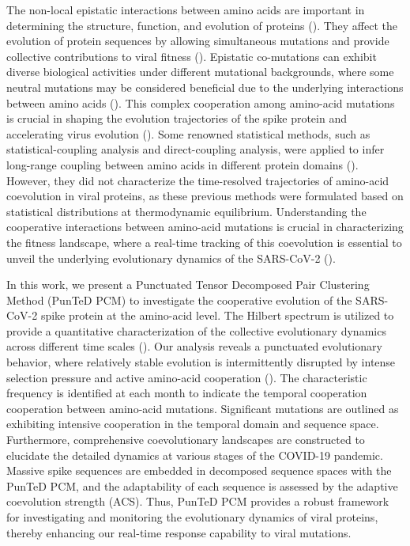\documentclass{sysbio}%
\begin{document}
The non-local epistatic interactions between amino acids are important in determining the structure, function, and evolution of proteins (\cite{eptasis_overall,sca}). They affect the evolution of protein sequences by allowing simultaneous mutations and provide collective contributions to viral fitness (\cite{DMS_binding_affinity,pingzhi,epistasis_lower_b}). Epistatic co-mutations can exhibit diverse biological activities under different mutational backgrounds, where some neutral mutations may be considered beneficial due to the underlying interactions between amino acids (\cite{epistasis_compensatory,epistasis_g}). This complex cooperation among amino-acid mutations is crucial in shaping the evolution trajectories of the spike protein and accelerating virus evolution (\cite{constrain,viral_evo_constrain,bak1993punctuated,bak1989self}). 
Some renowned statistical methods, such as statistical-coupling analysis and direct-coupling analysis, were applied to infer long-range coupling between amino acids in different protein domains (\cite{sca,dca}). However, they did not characterize the time-resolved trajectories of amino-acid coevolution in viral proteins, as these previous methods were formulated based on statistical distributions at thermodynamic equilibrium. Understanding the cooperative interactions between amino-acid mutations is crucial in characterizing the fitness landscape, where a real-time tracking of this coevolution is essential to unveil the underlying evolutionary dynamics of the SARS-CoV-2 (\cite{pingzhi}). 

In this work, we present a Punctuated Tensor Decomposed Pair Clustering Method (PunTeD PCM) to investigate the cooperative evolution of the SARS-CoV-2 spike protein at the amino-acid level. The Hilbert spectrum is utilized to provide a quantitative characterization of the collective evolutionary dynamics across different time scales (\cite{huang2014hilbert}). Our analysis reveals a punctuated evolutionary behavior, where relatively stable evolution is intermittently disrupted by intense selection pressure and active amino-acid cooperation (\cite{bak1993punctuated,JianLu2023MBE}). The characteristic frequency is identified at each month to indicate the temporal cooperation cooperation between amino-acid mutations. Significant mutations are outlined as exhibiting intensive cooperation in the temporal domain and sequence space. Furthermore, comprehensive coevolutionary landscapes are constructed to elucidate the detailed dynamics at various stages of the COVID-19 pandemic. Massive spike sequences are embedded in decomposed sequence spaces with the PunTeD PCM, and the adaptability of each sequence is assessed by the adaptive coevolution strength (ACS). Thus, PunTeD PCM provides a robust framework for investigating and monitoring the evolutionary dynamics of viral proteins, thereby enhancing our real-time response capability to viral mutations. 
\end{document}
